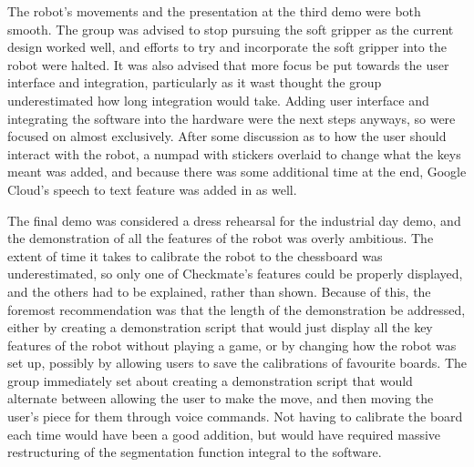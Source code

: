\documentclass[onecolumn]{IEEEtran}
\begin{document}
The robot's movements and the presentation at the third demo were both smooth. The group was advised to stop pursuing the soft gripper as the current design worked well, and efforts to try and incorporate the soft gripper into the robot were halted. It was also advised that more focus be put towards the user interface and integration, particularly as it wast thought the group underestimated how long integration would take. Adding user interface and integrating the software into the hardware were the next steps anyways, so were focused on almost exclusively. After some discussion as to how the user should interact with the robot, a numpad with stickers overlaid to change what the keys meant was added, and because there was some additional time at the end, Google Cloud's speech to text feature was added in as well.\par
The final demo was considered a dress rehearsal for the industrial day demo, and the demonstration of all the features of the robot was overly ambitious. The extent of time it takes to calibrate the robot to the chessboard was underestimated, so only one of Checkmate's features could be properly displayed, and the others had to be explained, rather than shown. Because of this, the foremost recommendation was that the length of the demonstration be addressed, either by creating a demonstration script that would just display all the key features of the robot without playing a game, or by changing how the robot was set up, possibly by allowing users to save the calibrations of favourite boards. The group immediately set about creating a demonstration script that would alternate between allowing the user to make the move, and then moving the user's piece for them through voice commands. Not having to calibrate the board each time would have been a good addition, but would have required massive restructuring of the segmentation function integral to the software.\par
\end{document}
